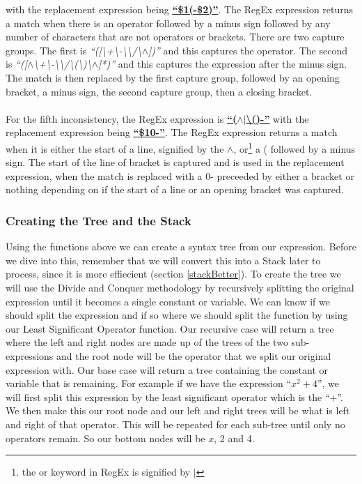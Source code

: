 \documentclass[../../../../../main.tex]{subfiles}
\begin{document}
with the replacement expression being \textbf{\underline{``\$1(-\$2)''}}. The RegEx expression returns a match when there is an operator followed by a minus sign followed by any number of characters that are not operators or brackets. There are two capture groups. The first is \textit{``([\textbackslash+\textbackslash-\textbackslash*\textbackslash/\textbackslash$\wedge$])''} and this captures the operator. The second is \textit{``([$\wedge$\textbackslash+\textbackslash-\textbackslash*\textbackslash/\textbackslash(\textbackslash)\textbackslash$\wedge$]*)''} and this captures the expression after the minus sign. The match is then replaced by the first capture group, followed by an opening bracket, a minus sign, the second capture group, then a closing bracket.\\ \\
For the fifth inconsistency, the RegEx expression is
\textbf{\underline{``($\wedge$$|$\textbackslash()-''}}
with the replacement expression being \textbf{\underline{``\$10-''}}. The RegEx expression returns a match when it is either the start of a line, signified by the $\wedge$, or\footnote{the or keyword in RegEx is signified by $|$} a ( followed by a minus sign. The start of the line of bracket is captured and is used in the replacement expression, when the match is replaced with a 0- preceeded by either a bracket or nothing depending on if the start of a line or an opening bracket was captured.
\newpage
\subsubsection{Creating the Tree and the Stack}
Using the functions above we can create a syntax tree from our expression. Before we dive into this, remember that we will convert this into a Stack later to process, since it is more effiecient (section \ref{stackBetter}). To create the tree we will use the Divide and Conquer methodology by recursively splitting the original expression until it becomes a single constant or variable. We can know if we should split the expression and if so where we should split the function by using our Least Significant Operator function. Our recursive case will return a tree where the left and right nodes are made up of the trees of the two sub-expressions and the root node will be the operator that we split our original expression with. Our base case will return a tree containing the constant or variable that is remaining. For example if we have the expression ``$x^2 + 4$'', we will first split this expression by the least significant operator which is the ``$+$''. We then make this our root node and our left and right trees will be what is left and right of that operator. This will be repeated for each sub-tree until only no operators remain. So our bottom nodes will be $x$, 2 and 4.
\end{document}
